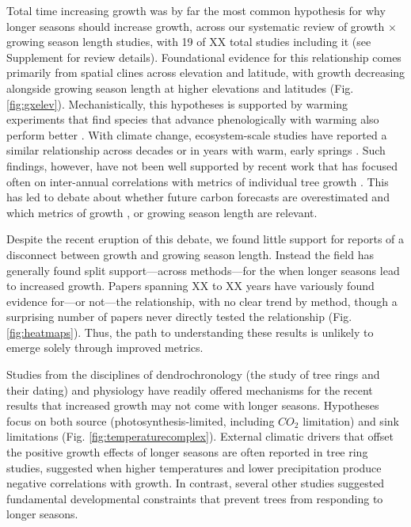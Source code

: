 \documentclass[11pt]{article}
\begin{document}
Total time increasing growth was by far the most common hypothesis for why longer seasons should increase growth, across our systematic review of growth $\times$ growing season length studies, with 19 of XX total studies including it (see Supplement for review details). Foundational evidence for this relationship comes primarily from spatial clines across elevation and latitude, with growth decreasing alongside growing season length at higher elevations and latitudes (Fig. \ref{fig:gxelev}). Mechanistically, this hypotheses is supported by warming experiments that find species that advance phenologically with warming also perform better \citep[with performance most often measured by growth,][]{Cleland:2012}. With climate change, ecosystem-scale studies have reported a similar relationship across decades \citep{keenan2014net} or in years with warm, early springs \citep{chen1999effects}. Such findings, however, have not been well supported by recent work that has focused often on inter-annual correlations with metrics of individual tree growth \citep{dow2022warm,silvestro2023longer}. This has led to debate about whether future carbon forecasts are overestimated and which metrics of growth \citep{green2022limits}, or growing season length \cite{korner2023four} are relevant.

Despite the recent eruption of this debate, we found little support for reports of a disconnect between growth and growing season length. Instead the field has generally found split support---across methods---for the when longer seasons lead to increased growth. Papers spanning XX to XX years have variously found evidence for---or not---the relationship, with no clear trend by method, though a surprising number of papers never directly tested the relationship (Fig. \ref{fig:heatmaps}). Thus, the path to understanding these results is unlikely to emerge solely through improved metrics. 

Studies from the disciplines of dendrochronology (the study of tree rings and their dating) and physiology have readily offered mechanisms for the recent results that increased growth may not come with longer seasons. Hypotheses focus on both source (photosynthesis-limited, including $CO_2$ limitation) and sink limitations (Fig. \ref{fig:temperaturecomplex}). External climatic drivers that offset the positive growth effects of longer seasons are often reported in tree ring studies, suggested when higher temperatures and lower precipitation produce negative correlations with growth. In contrast, several other studies suggested fundamental developmental constraints that prevent trees from responding to longer seasons. 
\end{document}
